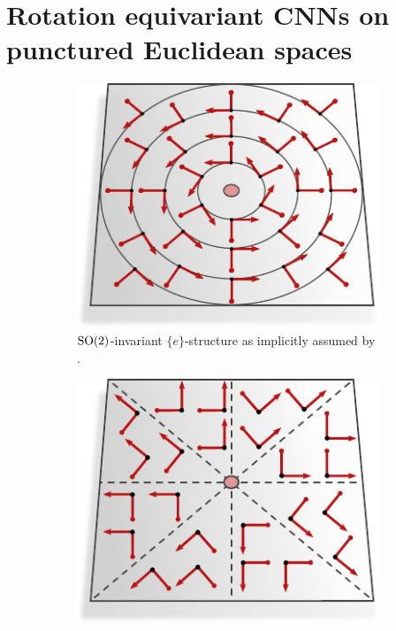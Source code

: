 

\section{Rotation equivariant CNNs on punctured Euclidean spaces}
\label{sec:instantiations_euclidean_polar}

\begin{figure}
    \centering
    \begin{subfigure}[b]{0.47\textwidth}
        \centering
        \includegraphics[width=.7\textwidth]{figures/G_structure_R2_no_origin_SO2.pdf}
        \captionsetup{format=hang, width=.82\textwidth}
        \caption{\small
            $\operatorname{SO}(2)$-invariant $\{e\}$-structure as implicitly assumed by \citet{finzi2020generalizing}.
        }
        \label{fig:G_structure_R2_no_origin_SO2}
    \end{subfigure}
    \hfill
    \begin{subfigure}[b]{0.47\textwidth}
        \centering
        \includegraphics[width=.7\textwidth]{figures/G_structure_R2_no_origin_C8.pdf}
        \captionsetup{format=hang, width=.78\textwidth}

\end{subfigure}
\end{figure}
